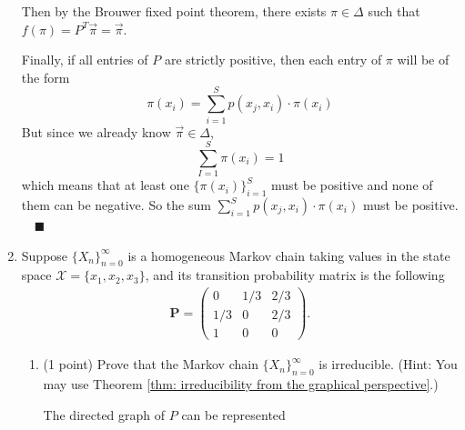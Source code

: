 \documentclass[11pt,letterpaper, leqno]{article}
\numberwithin{equation}{section}
\numberwithin{theorem}{section}
\numberwithin{lemma}{section}
\numberwithin{corollary}{section}
\numberwithin{definition}{section}
\numberwithin{proposition}{section}
\numberwithin{remark}{section}
\numberwithin{example}{section}
\renewcommand{\qed}{\quad \blacksquare}
\begin{document}
\begin{enumerate}
            Then by the Brouwer fixed point theorem, there exists $\pi \in \Delta$ such that $f(\pi) = P^T \vec \pi = \vec \pi$. 

            Finally, if all entries of $P$ are strictly positive, then each entry of $\pi$ will be of the form 
            \[\pi(x_i) = \sum_{i=1}^S p(x_j, x_i) \cdot \pi(x_i)\]
            But since we already know $\vec\pi \in \Delta$,
            \[\sum_{I=1}^S \pi(x_i) = 1\]
            which means that at least one $\{\pi(x_i)\}_{i=1}^S$ must be positive and none of them can be negative. So the sum $\sum_{i=1}^S p(x_j, x_i) \cdot \pi(x_i)$ must be positive. $\qed$
        \color{black}

    \pagebreak

    \item Suppose $\{X_n\}_{n=0}^\infty$ is a homogeneous Markov chain taking values in the state space $\mathcal{X}=\{x_1, x_2, x_3\}$, and its transition probability matrix is the following
        \begin{align*}
            \boldsymbol{P}= \begin{pmatrix}
                0 & 1/3 & 2/3\\
                1/3 & 0 & 2/3 \\
                1 & 0 & 0
            \end{pmatrix}.
         \end{align*}
    
    \begin{enumerate}
        \item (1 point) Prove that the Markov chain $\{X_n\}_{n=0}^\infty$ is irreducible. (Hint: You may use Theorem \ref{thm: irreducibility from the graphical perspective}.)
        
            \color{blue}
                The directed graph of $P$ can be represented 

                \begin{center}
\end{center}
\end{enumerate}
\end{enumerate}
\end{document}
